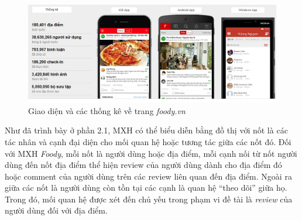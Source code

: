 \documentclass[12pt]{extarticle}
\begin{document}
			\begin{figure}[h!]
				\includegraphics[width=\linewidth]{foody}
				\caption{Giao diện và các thống kê về trang \textit{foody.vn}}
				\label{fig:foody}
			\end{figure}

			\par Như đã trình bày ở phần 2.1, MXH có thể biểu diễn bằng đồ thị với nốt là các tác nhân và cạnh đại diện cho mối quan hệ hoặc tương tác giữa các nốt đó. Đối với MXH \textit{Foody}, mỗi nốt là người dùng hoặc địa điểm, mỗi cạnh nối từ nốt người dùng đến nốt địa điểm thể hiện review của người dùng dành cho địa điểm đó hoặc comment của người dùng trên các review liên quan đến địa điểm. Ngoài ra giữa các nốt là người dùng còn tồn tại các cạnh là quan hệ “theo dõi” giữa họ. Trong đó, mối quan hệ được xét đến chủ yếu trong phạm vi đề tài là \textit{review} của người dùng đối với địa điểm.
\end{document}
